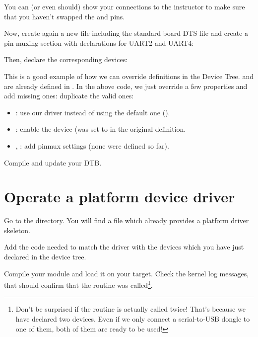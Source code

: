You can (or even should) show your connections to the instructor
to make sure that you haven't swapped the  and  pins.

Now, create again a new
 file including
the standard board DTS file and create a pin muxing section with
declarations for UART2 and UART4:

{\small {}}

Then, declare the corresponding devices:


This is a good example of how we can override definitions in the Device
Tree.  and  are already defined in
. In the above code, we just
override a few properties and add missing ones:
duplicate the valid ones:

\begin{itemize}
\item {}: use our driver instead of using the default one
      ().
\item {}: enable the device (was set to  in
      the original definition.
\item {}, : add pinmux settings
      (none were defined so far).
\end{itemize}

Compile and update your DTB.

\section{Operate a platform device driver}

Go to the  directory.
You will find a  file which already provides a platform
driver skeleton.

Add the code needed to match the driver with the devices which you have
just declared in the device tree.

Compile your module and load it on your target. Check the kernel log
messages, that should confirm that the  routine was
called\footnote{Don't be surprised if the  routine is
actually called twice! That's because we have declared two devices.
Even if we only connect a serial-to-USB dongle to one of them, both
of them are ready to be used!}.

